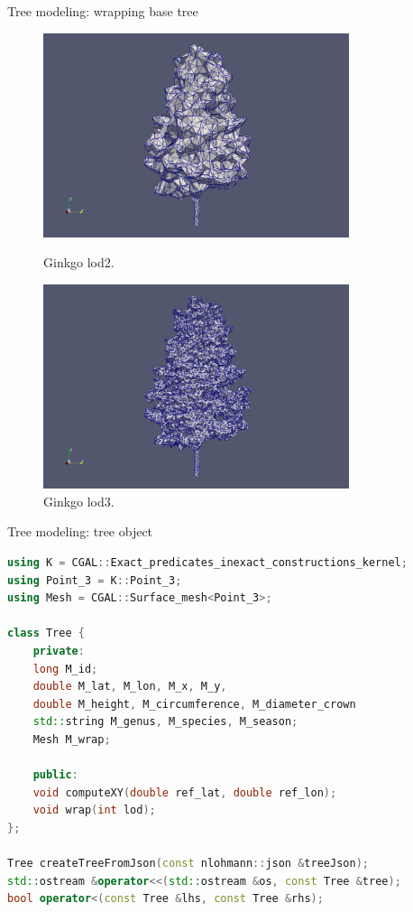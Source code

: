 \documentclass[10pt]{beamer}
\begin{document}
\begin{frame}{Tree modeling: wrapping base tree}
\begin{figure}[H]
    \centering
    \begin{minipage}{0.49\textwidth}
        \centering
        \includegraphics[width=0.8\textwidth]{images/gingko_lod2.png}
        \caption{Ginkgo lod2.}
    \end{minipage}\hfill
    \begin{minipage}{0.49\textwidth}
        \centering
        \includegraphics[width=0.8\textwidth]{images/gingko_lod3.png}
        \caption{Ginkgo lod3.}
    \end{minipage}
\end{figure}
\end{frame}

\begin{frame}[fragile]{Tree modeling: tree object}

\begin{lstlisting}[language=C++]
using K = CGAL::Exact_predicates_inexact_constructions_kernel;
using Point_3 = K::Point_3;
using Mesh = CGAL::Surface_mesh<Point_3>;

class Tree {
    private:
    long M_id;
    double M_lat, M_lon, M_x, M_y,
    double M_height, M_circumference, M_diameter_crown
    std::string M_genus, M_species, M_season;
    Mesh M_wrap;

    public:
    void computeXY(double ref_lat, double ref_lon);
    void wrap(int lod);
};

Tree createTreeFromJson(const nlohmann::json &treeJson);
std::ostream &operator<<(std::ostream &os, const Tree &tree);
bool operator<(const Tree &lhs, const Tree &rhs);
\end{lstlisting}
\end{frame}
\end{document}
